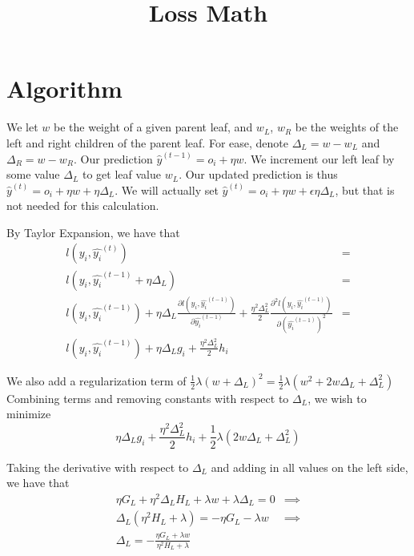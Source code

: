 \documentclass{article}
\begin{document}
\title{Loss Math}
\author{}
\date{}

\maketitle

\section*{Algorithm}
We let $w$ be the weight of a given parent leaf, and $w_L$, $w_R$ be the weights of the left and right children of the parent leaf. 
For ease, denote $\Delta_L = w - w_L$ and $\Delta_R = w - w_R$. Our prediction $\hat{y}^{(t - 1)} = o_i + \eta w$. 
We increment our left leaf by some value $\Delta_L$ to get leaf value $w_L$. Our updated prediction is thus
$\hat{y}^{(t)} = o_i + \eta w + \eta \Delta_L$. We will actually set $\hat{y}^{(t)} = o_i + \eta w + \epsilon \eta \Delta_L$, 
but that is not needed for this calculation.

By Taylor Expansion, we have that \begin{align*}
    l(y_i, \hat{y_i}^{(t)}) &= \\
    l(y_i, \hat{y_i}^{(t - 1)} + \eta \Delta_L) &= \\
    l(y_i, \hat{y_i}^{(t - 1)}) + \eta \Delta_L \frac{\partial l(y_i, \hat{y_i}^{(t - 1)})}{\partial \hat{y_i}^{(t - 1)}} + \frac{\eta^2 \Delta_L^2}{2} \frac{\partial^2 l(y_i, \hat{y_i}^{(t - 1)})}{\partial (\hat{y_i}^{(t - 1)})^2}&= \\
    l(y_i, \hat{y_i}^{(t - 1)}) + \eta \Delta_L g_i + \frac{\eta^2 \Delta_L^2}{2} h_i
\end{align*}

We also add a regularization term of $\frac{1}{2}\lambda(w + \Delta_L)^2 = \frac{1}{2} \lambda (w^2 + 2w\Delta_L + \Delta_L^2)$
Combining terms and removing constants with respect to $\Delta_L$, we wish to minimize \[
 \eta \Delta_L g_i + \frac{\eta^2 \Delta_L^2}{2} h_i + \frac{1}{2} \lambda (2w\Delta_L + \Delta_L^2)
\]

Taking the derivative with respect to $\Delta_L$ and adding in all values on the left side, we have that \begin{align*}
    \eta G_L + \eta^2 \Delta_L H_L + \lambda w + \lambda \Delta_L = 0 &\implies \\
    \Delta_L \left(\eta^2 H_L + \lambda \right) = -\eta G_L - \lambda w &\implies \\
    \Delta_L = -\frac{\eta G_L + \lambda w}{\eta^2 H_L + \lambda}
\end{align*}
\end{document}
